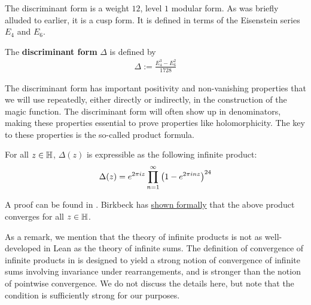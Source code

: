 The discriminant form is a weight $12$, level $1$ modular form. As was briefly alluded to earlier, it is a cusp form. It is defined in terms of the Eisenstein series $E_4$ and $E_6$.

\begin{boxdefinition}\label{Ch2:Def:DiscForm}
    The \textbf{discriminant form} $\Delta$ is defined by
    \begin{align}
        \Delta := \frac{E_4^3 - E_6^2}{1728}
        \label{Ch2:Eq:DiscForm_def}
    \end{align}
\end{boxdefinition}

The discriminant form has important positivity and non-vanishing properties that we will use repeatedly, either directly or indirectly, in the construction of the magic function. The discriminant form will often show up in denominators, making these properties essential to prove properties like holomorphicity. The key to these properties is the so-called product formula.

\begin{boxtheorem}\label{Ch2:Thm:Delta_Product_Formula}
    For all $z \in \mathbb{H}$, $\Delta(z)$ is expressible as the following infinite product:
    \begin{align}
        \Delta(z) = e^{2 \pi i z} \prod_{n=1}^{\infty} \left( 1 - e^{2 \pi i n z} \right)^{24}
    \end{align}
\end{boxtheorem}


A proof can be found in \cite[Chapter VII, §4, Theorem 6, p. 95]{SerreArith}. Birkbeck has \href{https://github.com/thefundamentaltheor3m/Sphere-Packing-Lean/blob/ba092be9cdebb1a9c170a22c234e71ca1842a173/SpherePacking/ModularForms/multipliable_lems.lean#L107}{shown formally} that the above product converges for all $z \in \mathbb{H}$.

As a remark, we mention that the theory of infinite products is not as well-developed in Lean as the theory of infinite sums. The definition of convergence of infinite products in \href{https://github.com/leanprover-community/mathlib4/blob/a98ecd2e7d46e2d29c4b572b1195c367b0106bf2/Mathlib/Topology/Algebra/InfiniteSum/Defs.lean#L92}{\mathlib} is designed to yield a strong notion of convergence of infinite sums involving invariance under rearrangements, and is stronger than the notion of pointwise convergence. We do not discuss the details here, but note that the condition is sufficiently strong for our purposes.

